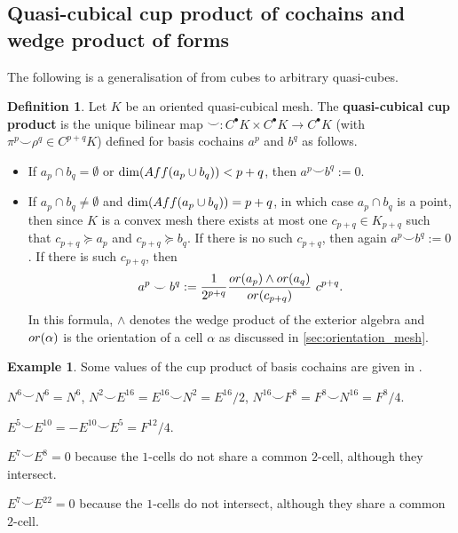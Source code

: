 \documentclass{elsarticle}
\theoremstyle{definition}
\newtheorem{definition}[theorem]{Definition}
\newtheorem{example}[theorem]{Example}
\newcommand{\OR}{\mathop{\rm or}\nolimits}   %
\begin{document}
\subsection{Quasi-cubical cup product of cochains and wedge product of forms}
\label{sec:wedge}
The following is a generalisation of
\cite[Definition 3.2.1]{arnold2012discrete} from cubes to arbitrary quasi-cubes.
\begin{definition}
\label{thm:cup_product}
  Let $K$ be an oriented quasi-cubical mesh. The \textbf{quasi-cubical cup product} is the unique bilinear map $\smile \colon C^{\bullet} K \times C^{\bullet} K \to C^{\bullet} K$ (with $\pi^p \smile \rho^q \in C^{p + q} K$) defined for basis cochains $a^p$ and $b^q$ as follows. 
  \begin{itemize}
    \item
      If $a_p \cap b_q = \emptyset$ or $\dim({\rm Aff}(a_p \cup b_q)) < p + q$, then $a^p \smile b^q := 0$.
    \item
      If $a_p \cap b_q \neq \emptyset$ and $\dim({\rm Aff}(a_p \cup b_q)) = p + q$, in which case $a_p \cap b_q$ is a point, then since $K$ is a convex mesh there exists at most one $c_{p +q} \in K_{p + q}$ such that $c_{p + q} \succeq a_p$ and $c_{p + q} \succeq b_q$.
      If there is no such $c_{p + q}$, then again $a^p \smile b^q := 0$. If there is such $c_{p + q}$, then
      \begin{equation}
        \label{eq:cup_product}
        a^p \smile b^q := \frac{1}{2^{p + q}}
          \frac{\OR(a_p) \wedge \OR(a_q)}{\OR(c_{p + q})}\ c^{p + q}.
      \end{equation}
      In this formula, $\wedge$ denotes the wedge product of the exterior algebra and $\OR(\alpha)$ is the orientation of a cell $\alpha$ as discussed in \ref{sec:orientation_mesh}.
  \end{itemize}
\end{definition}
\begin{example}
  Some values of the cup product of basis cochains are given in .

  $N^6 \smile N^6 = N^6$, $N^2 \smile E^{16} = E^{16} \smile N^2 = E^{16} / 2$, $N^{16} \smile F^8 = F^8 \smile N^{16} = F^8 / 4$.

  $E^5 \smile E^{10} = -E^{10} \smile E^5 = F^{12} / 4$.

  $E^7 \smile E^8 = 0$ because the $1$-cells do not share a common $2$-cell, although they intersect.

  $E^7 \smile E^{22} = 0$ because the $1$-cells do not intersect, although they share a common $2$-cell.
\end{example}
\end{document}
